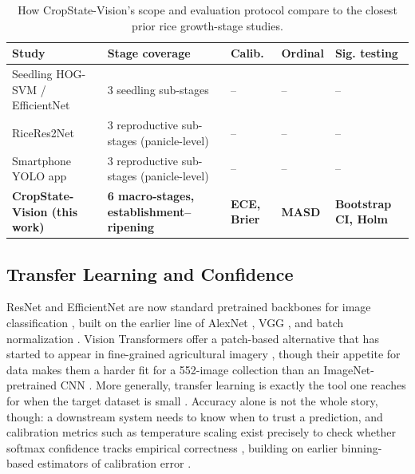 \documentclass{llncs}
\begin{document}
\begin{table}[t]
\centering
\caption{How CropState-Vision's scope and evaluation protocol compare to the closest prior rice growth-stage studies.}
\label{tab:positioning}
\small
\begin{tabular}{p{}p{}>{\centering\arraybackslash}p{}>{\centering\arraybackslash}p{}p{}}
\toprule
\textbf{Study} & \textbf{Stage coverage} & \textbf{Calib.} & \textbf{Ordinal} & \textbf{Sig. testing} \\
\midrule
Seedling HOG-SVM / EfficientNet \cite{tan2022machine} & 3 seedling sub-stages & -- & -- & -- \\
RiceRes2Net \cite{tan2023ricepanicle} & 3 reproductive sub-stages (panicle-level) & -- & -- & -- \\
Smartphone YOLO app \cite{zheng2025android} & 3 reproductive sub-stages (panicle-level) & -- & -- & -- \\
\textbf{CropState-Vision (this work)} & \textbf{6 macro-stages, establishment--ripening} & \textbf{ECE, Brier} & \textbf{MASD} & \textbf{Bootstrap CI, Holm} \\
\bottomrule
\end{tabular}
\end{table}

\subsection{Transfer Learning and Confidence}

ResNet and EfficientNet are now standard pretrained backbones for image classification \cite{he2016deep,tan2019efficientnet}, built on the earlier line of AlexNet \cite{krizhevsky2012alexnet}, VGG \cite{simonyan2015vgg}, and batch normalization \cite{ioffe2015batchnorm}. Vision Transformers offer a patch-based alternative that has started to appear in fine-grained agricultural imagery \cite{dosovitskiy2021vit}, though their appetite for data makes them a harder fit for a 552-image collection than an ImageNet-pretrained CNN \cite{deng2009imagenet}. More generally, transfer learning is exactly the tool one reaches for when the target dataset is small \cite{pan2010survey}. Accuracy alone is not the whole story, though: a downstream system needs to know when to trust a prediction, and calibration metrics such as temperature scaling exist precisely to check whether softmax confidence tracks empirical correctness \cite{guo2017calibration}, building on earlier binning-based estimators of calibration error \cite{naeini2015calibration}.
\end{document}
